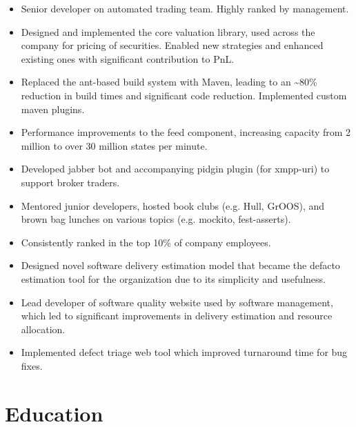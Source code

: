 \documentclass[11pt,a4paper,roman]{moderncv}
\begin{document}
\vspace{5mm}

\begin{itemize}
\item Senior developer on automated trading team. Highly ranked by management.
\item Designed and implemented the core valuation library, used across the company for pricing of securities. Enabled new strategies and enhanced existing ones with significant contribution to PnL.\newline
\item Replaced the ant-based build system with Maven, leading to an \textasciitilde80\% reduction in build times and significant code reduction. Implemented custom maven plugins.\newline
\item Performance improvements to the feed component, increasing capacity from 2 million to over 30 million states per minute.\newline
\item Developed jabber bot and accompanying pidgin plugin (for xmpp-uri) to support broker traders.\newline
\item Mentored junior developers, hosted book clubs (e.g. Hull, GrOOS), and brown bag lunches on various topics (e.g. mockito, fest-asserts).
\end{itemize}

\vspace{5mm}

\begin{itemize}
\item Consistently ranked in the top 10\% of company employees.
\item Designed novel software delivery estimation model that became the defacto estimation tool for the organization due to its simplicity and usefulness.\newline
\item Lead developer of software quality website used by software management, which led to significant improvements in delivery estimation and resource allocation.\newline
\item Implemented defect triage web tool which improved turnaround time for bug fixes.\newline
\end{itemize}

\section{Education}
\end{document}

